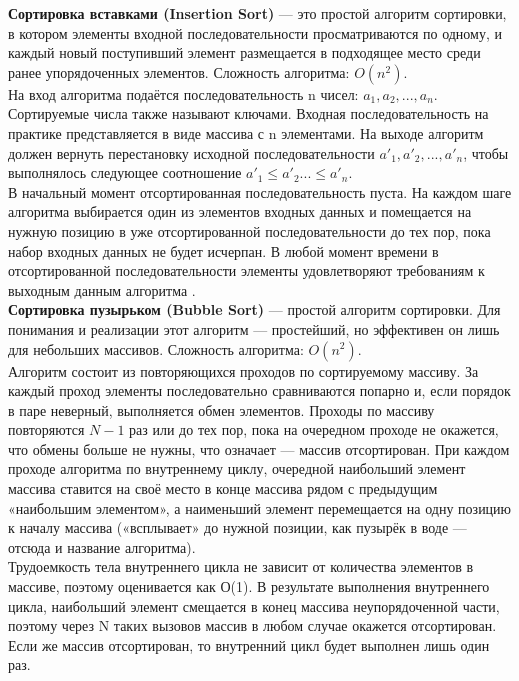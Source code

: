 \documentclass[a4paper, 14pt]{article}
\begin{document}
\textbf{Сортировка вставками (Insertion Sort)}
 — это простой алгоритм сортировки, в котором элементы входной последовательности просматриваются по одному, и каждый новый поступивший элемент размещается в подходящее место среди ранее упорядоченных элементов. Сложность алгоритма: $O(n^{2})$. \cite{knut}\\

На вход алгоритма подаётся последовательность n чисел: $a_{1},a_{2},...,a_{n}$. Сортируемые числа также называют ключами. Входная последовательность на практике представляется в виде массива с n элементами. На выходе алгоритм должен вернуть перестановку исходной последовательности $a'_{1},a'_{2},...,a'_{n}$, чтобы выполнялось следующее соотношение $a'_{1} \le a'_{2} ... \le a'_{n}$\cite{korman}.\\

В начальный момент отсортированная последовательность пуста. На каждом шаге алгоритма выбирается один из элементов входных данных и помещается на нужную позицию в уже отсортированной последовательности до тех пор, пока набор входных данных не будет исчерпан. В любой момент времени в отсортированной последовательности элементы удовлетворяют требованиям к выходным данным алгоритма \cite{macconel}.\\

\textbf{Сортировка пузырьком (Bubble Sort)}
 — простой алгоритм сортировки. Для понимания и реализации этот алгоритм — простейший, но эффективен он лишь для небольших массивов. Сложность алгоритма: $O(n^{2})$. \cite{knut}\\

Алгоритм состоит из повторяющихся проходов по сортируемому массиву. За каждый проход элементы последовательно сравниваются попарно и, если порядок в паре неверный, выполняется обмен элементов. Проходы по массиву повторяются 
$N-1$ раз или до тех пор, пока на очередном проходе не окажется, что обмены больше не нужны, что означает — массив отсортирован. При каждом проходе алгоритма по внутреннему циклу, очередной наибольший элемент массива ставится на своё место в конце массива рядом с предыдущим «наибольшим элементом», а наименьший элемент перемещается на одну позицию к началу массива («всплывает» до нужной позиции, как пузырёк в воде — отсюда и название алгоритма).\\

Трудоемкость тела внутреннего цикла не зависит от количества элементов в массиве, поэтому оценивается как О(1). В результате выполнения внутреннего цикла, наибольший элемент смещается в конец массива неупорядоченной части, поэтому через N таких вызовов массив в любом случае окажется отсортирован. Если же массив отсортирован, то внутренний цикл будет выполнен лишь один раз. \\
\end{document}
